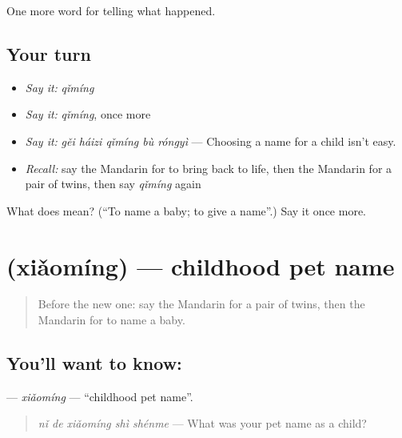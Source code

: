 \begin{grammarlens}[title={What you've built}]
One more word for telling what happened.
\end{grammarlens}

\subsection*{Your turn}
\begin{itemize}
\raggedright
  \item \emph{Say it:} \emph{qǐmíng}
  \item \emph{Say it:} \emph{qǐmíng}, once more
  \item \emph{Say it:} \emph{gěi háizi qǐmíng bù róngyì} — Choosing a name for a child isn't easy.
  \item \emph{Recall:} say the Mandarin for to bring back to life, then the Mandarin for a pair of twins, then say \emph{qǐmíng} again
\end{itemize}

\begin{tcolorbox}[breakable,colback=teal!4,colframe=teal!35!black,title={Before you move on}]
What does  mean? (\textquotedblleft{}To name a baby; to give a name\textquotedblright{}.) Say it once more.
\end{tcolorbox}
\section[\texorpdfstring{\zh{小名} (xiǎomíng)}{小名 (xiǎomíng)}]{ (xiǎomíng) — childhood pet name}

\label{lesson:ZH-C303-xiaoming}



\begin{quote}
Before the new one: say the Mandarin for a pair of twins, then the Mandarin for to name a baby.
\end{quote}

\subsection*{You'll want to know: }
\textbf{} — \emph{xiǎomíng} — \textquotedblleft{}childhood pet name\textquotedblright{}.

\begin{quote}
\textbf{} \emph{nǐ de xiǎomíng shì shénme} — What was your pet name as a child?
\end{quote}

